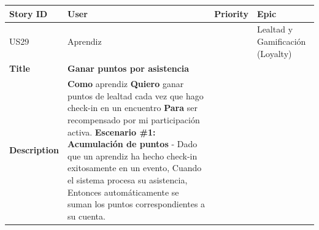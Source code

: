 {\def\LTcaptype{none} %
\begin{longtable}[]{@{}
  >{\raggedright\arraybackslash}p{}
  >{\raggedright\arraybackslash}p{}
  >{\raggedright\arraybackslash}p{}
  >{\raggedright\arraybackslash}p{}@{}}
\toprule\noalign{}
\begin{minipage}[b]{\linewidth}\raggedright
Story ID
\end{minipage} & \begin{minipage}[b]{\linewidth}\raggedright
User
\end{minipage} & \begin{minipage}[b]{\linewidth}\raggedright
Priority
\end{minipage} & \begin{minipage}[b]{\linewidth}\raggedright
Epic
\end{minipage} \\
\midrule\noalign{}
\endhead
\bottomrule\noalign{}
\endlastfoot
US29 & Aprendiz & 5 & Lealtad y Gamificación (Loyalty) \\
\textbf{Title} & \textbf{Ganar puntos por asistencia} & & \\
\textbf{Description} & \textbf{Como} aprendiz \textbf{Quiero} ganar
puntos de lealtad cada vez que hago check-in en un encuentro
\textbf{Para} ser recompensado por mi participación activa.
\textbf{Escenario \#1: Acumulación de puntos} - Dado que un aprendiz ha
hecho check-in exitosamente en un evento, Cuando el sistema procesa su
asistencia, Entonces automáticamente se suman los puntos
correspondientes a su cuenta. & & \\
\end{longtable}
}

